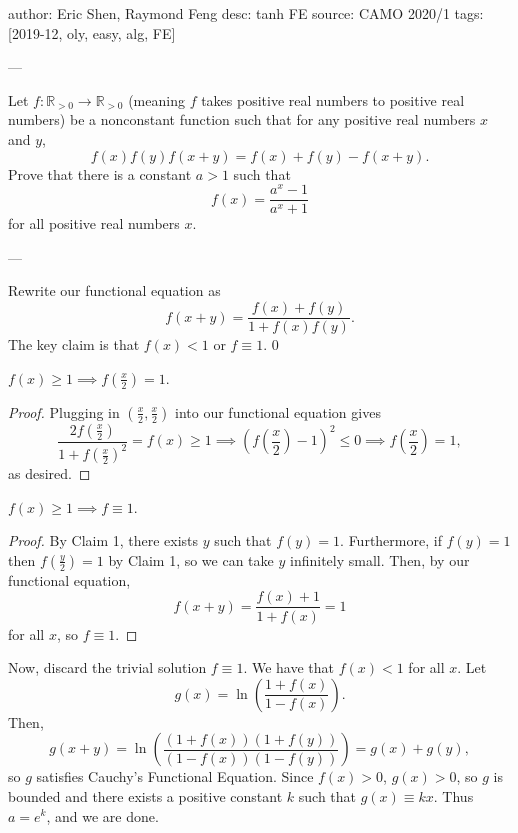 author: Eric Shen, Raymond Feng
desc: tanh FE
source: CAMO 2020/1
tags: [2019-12, oly, easy, alg, FE]

---

Let $f:\mathbb R_{>0}\to\mathbb R_{>0}$ (meaning $f$ takes positive real numbers to positive real numbers) be a nonconstant function such that for any positive real numbers $x$ and $y$, \[f(x)f(y)f(x+y)=f(x)+f(y)-f(x+y).\]
Prove that there is a constant $a>1$ such that \[f(x)=\frac{a^x-1}{a^x+1}\]
for all positive real numbers $x$.

---

Rewrite our functional equation as \[f(x+y)=\frac{f(x)+f(y)}{1+f(x)f(y)}.\]The key claim is that $f(x)<1$ or $f\equiv 1$.
\setcounter{claim}0
\begin{claim}
    $f(x)\ge 1\implies f(\tfrac x2)=1$.
\end{claim}
\begin{proof}
    Plugging in $(\tfrac x2, \tfrac x2)$ into our functional equation gives \[\frac{2f(\tfrac x2)}{1+f(\tfrac x2)^2}=f(x)\ge 1\implies \left(f\left(\frac x2\right)-1\right)^2\le 0\implies f\left(\frac x2\right)=1,\]
    as desired.
\end{proof}
\begin{claim}
    $f(x)\ge 1\implies f\equiv 1$.
\end{claim}
\begin{proof}
    By Claim 1, there exists $y$ such that $f(y)=1$. Furthermore, if $f(y)=1$ then $f(\tfrac y2)=1$ by Claim 1, so we can take  $y$ infinitely small. Then, by our functional equation, \[f(x+y)=\frac{f(x)+1}{1+f(x)}=1\]for all $x$, so $f\equiv 1$.
\end{proof}

Now, discard the trivial solution $f\equiv 1$. We have that $f(x)<1$ for all $x$. Let \[g(x)=\ln\left(\frac{1+f(x)}{1-f(x)}\right).\]
Then, \[g(x+y)=\ln\left(\frac{(1+f(x))(1+f(y))}{(1-f(x))(1-f(y))}\right)=g(x)+g(y),\]
so $g$ satisfies Cauchy's Functional Equation. Since $f(x)>0$, $g(x)>0$, so $g$ is bounded and there exists a positive constant $k$ such that $g(x)\equiv kx$. Thus $a=e^k$, and we are done.
